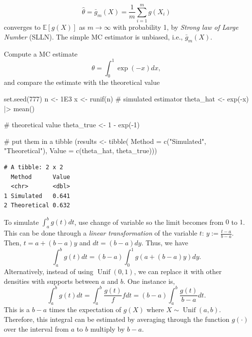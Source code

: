 \documentclass[
  letterpaper,
  DIV=11,
  numbers=noendperiod]{scrreprt}
\newenvironment{Shaded}{\begin{snugshade}}{\end{snugshade}}
\newcommand{\AttributeTok}[1]{\textcolor[rgb]{0.40,0.45,0.13}{#1}}
\newcommand{\CommentTok}[1]{\textcolor[rgb]{0.37,0.37,0.37}{#1}}
\newcommand{\DecValTok}[1]{\textcolor[rgb]{0.68,0.00,0.00}{#1}}
\newcommand{\FloatTok}[1]{\textcolor[rgb]{0.68,0.00,0.00}{#1}}
\newcommand{\FunctionTok}[1]{\textcolor[rgb]{0.28,0.35,0.67}{#1}}
\newcommand{\NormalTok}[1]{\textcolor[rgb]{0.00,0.23,0.31}{#1}}
\newcommand{\OtherTok}[1]{\textcolor[rgb]{0.00,0.23,0.31}{#1}}
\newcommand{\SpecialCharTok}[1]{\textcolor[rgb]{0.37,0.37,0.37}{#1}}
\newcommand{\StringTok}[1]{\textcolor[rgb]{0.13,0.47,0.30}{#1}}
\begin{document}
\[\hat{\theta}=\bar{g}_m(X)=\frac{1}{m}\sum_{i=1}^m g(X_i)\] converges
to \(\mathbb{E}[g(X)]\) as \(m\to\infty\) with probability 1, by
\emph{Strong law of Large Number} (SLLN). The simple MC estimator is
unbiased, i.e., \(\bar{g}_m(X)\).

Compute a MC estimate \[
\theta = \int_0^1 \exp(-x)dx,
\] and compare the estimate with the theoretical value

\begin{Shaded}
\begin{Highlighting}[]
\FunctionTok{set.seed}\NormalTok{(}\DecValTok{777}\NormalTok{)}
\NormalTok{n }\OtherTok{\textless{}{-}} \FloatTok{1E3}
\NormalTok{x }\OtherTok{\textless{}{-}} \FunctionTok{runif}\NormalTok{(n)}
\CommentTok{\# simulated estimator}
\NormalTok{theta\_hat }\OtherTok{\textless{}{-}} \FunctionTok{exp}\NormalTok{(}\SpecialCharTok{{-}}\NormalTok{x) }\SpecialCharTok{|\textgreater{}} \FunctionTok{mean}\NormalTok{()}

\CommentTok{\# theoretical value}
\NormalTok{theta\_true }\OtherTok{\textless{}{-}} \DecValTok{1} \SpecialCharTok{{-}} \FunctionTok{exp}\NormalTok{(}\SpecialCharTok{{-}}\DecValTok{1}\NormalTok{)}

\CommentTok{\# put them in a tibble}
\NormalTok{(results }\OtherTok{\textless{}{-}} \FunctionTok{tibble}\NormalTok{(}
  \AttributeTok{Method =} \FunctionTok{c}\NormalTok{(}\StringTok{"Simulated"}\NormalTok{, }\StringTok{"Theoretical"}\NormalTok{),}
  \AttributeTok{Value  =} \FunctionTok{c}\NormalTok{(theta\_hat, theta\_true)))}
\end{Highlighting}
\end{Shaded}

\begin{verbatim}
# A tibble: 2 x 2
  Method      Value
  <chr>       <dbl>
1 Simulated   0.641
2 Theoretical 0.632
\end{verbatim}

To simulate \(\int_a^b g(t)dt\), use change of variable so the limit
becomes from \(0\) to \(1\). This can be done through a \emph{linear
transformation} of the variable \(t\): \(y:=\frac{t-a}{b-a}\). Then,
\(t=a+(b-a)y\) and \(dt=(b-a)dy\). Thus, we have \[
\int_a^b g(t)dt = (b-a)\int_0^1 g(a+(b-a)y)dy.
\] Alternatively, instead of using \(\operatorname{Unif}(0,1)\), we can
replace it with other densities with supports between \(a\) and \(b\).
One instance is, \[
\int_a^b g(t)dt = \int_a^b \frac{g(t)}{f}f dt = (b-a) \int_a^b  \frac{g(t)}{b-a} dt.
\] This is a \(b-a\) times the expectation of \(g(X)\) where
\(X\sim \operatorname{Unif}(a,b)\). Therefore, this integral can be
estimated by averaging through the function \(g(\cdot)\) over the
interval from \(a\) to \(b\) multiply by \(b-a\).
\end{document}
